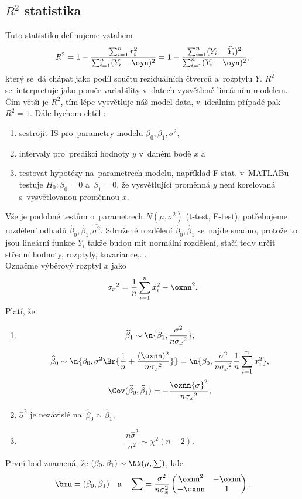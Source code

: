 \subsection*{$R^2$ statistika}
Tuto statistiku definujeme vztahem
$$R^2=1-\frac{\sum_{i=1}^{n}r_i^2}{\sum_{i=1}^{n}(Y_i-\oyn)^2}=1-\frac{\sum_{i=1}^{n}(Y_i-\widehat{Y}_i)^2}{\sum_{i=1}^{n}(Y_i-\oyn)^2}, $$
který se~dá chápat jako podíl součtu reziduálních čtverců a~rozptylu $Y$.
$R^2$ se~interpretuje jako poměr variability v~datech vysvětlené lineárním modelem. Čím větší je $R^2$, tím lépe vysvětluje náš model data, v~ideálním případě pak $R^2=1$.
Dále bychom chtěli:
\begin{enumerate}
\item sestrojit IS pro~parametry modelu $\beta_0, \beta_1, {\sigma}^2$,

\item intervaly pro~predikci hodnoty $y$ v~daném bodě $x$ a

\item testovat hypotézy na~parametrech modelu, například F-stat. v~MATLABu testuje $H_0:\beta_0=0$ a~$\beta_1=0$, že vysvětlující proměnná $y$ není korelovaná s~vysvětlovanou proměnnou $x$.
\end{enumerate}


Vše je podobné testům o~parametrech $N(\mu,{\sigma}^2)$ (t-test, F-test), potřebujeme rozdělení odhadů $\widehat{\beta}_0,\widehat{\beta}_1, \widehat{{\sigma}^2}$. Sdružené rozdělení $\widehat{\beta}_0,\widehat{\beta}_1$ se~najde snadno, protože to jsou lineární funkce $Y_i$ takže budou mít normální rozdělení, stačí tedy určit střední hodnoty, rozptyly, kovariance,...\\
Označme výběrový rozptyl $x$ jako
$${\sigma_x}^2=\frac{1}{n}\sum_{i=1}^{n}x_i^2-\oxnn^2. $$
Platí, že
\begin{enumerate}
\item $$ \widehat{\beta}_1\sim \n{\beta_1,\frac{{\sigma}^2}{n{\sigma_x}^2}}, $$
$$\widehat{\beta}_0\sim \n{\beta_0,{\sigma}^2\Br{\frac{1}{n}+\frac{(\oxnn)^2}{n{\sigma_x}^2}}}=\n{\beta_0,\frac{{\sigma}^2}{n{\sigma_x}^2}\frac{1}{n}\sum_{i=1}^{n}x_i^2}, $$
$$\Cov(\widehat{\beta}_0,\widehat{\beta}_1)=-\frac{\oxnn{\sigma}^2}{n{\sigma_x}^2}, $$
\item $\widehat{\sigma}^2 $ je nezávislé na~$\widehat{\beta}_0$ a~$\widehat{\beta}_1$,
\item $$\frac{n\widehat{\sigma}^2}{\sigma^2} \sim {\chi}^2(n-2).$$
\end{enumerate}
%

\begin{remark}
První bod znamená, že $(\beta_0,\beta_1)\sim \NN(\mu,\sum)$, kde
$$\bmu=(\beta_0,\beta_1)\quad \text{a}\quad \sum=\frac{\sigma^2}{n\sigma_x^2}\begin{pmatrix}
\oxnn^2 & -\oxnn\\
-\oxnn & 1
\end{pmatrix}. $$
\end{remark}


